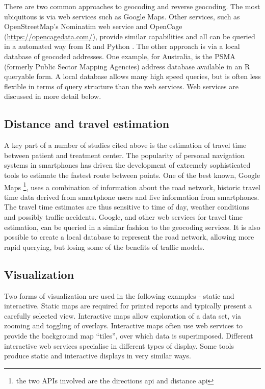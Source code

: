 \documentclass[utf8]{frontiersHLTH}
\begin{document}
There are two common approaches to geocoding and reverse geocoding. The
most ubiquitous is via web services such as Google Maps. Other services,
such as OpenStreetMap's Nominatim web service and OpenCage
(\url{https://opencagedata.com/}), provide similar capabilities and all
can be queried in a automated way from R and Python \cite{opencage}. The
other approach is via a local database of geocoded addresses. One
example, for Australia, is the PSMA (formerly Public Sector Mapping
Agencies) address database available in an R queryable form. A local
database allows many high speed queries, but is often less flexible in
terms of query structure than the web services. Web services are
discussed in more detail below.

\subsection{Distance and travel
estimation}\label{distance-and-travel-estimation}

A key part of a number of studies cited above is the estimation of
travel time between patient and treatment center. The popularity of
personal navigation systems in smartphones has driven the development of
extremely sophisticated tools to estimate the fastest route between
points. One of the best known, Google Maps \footnote{the two APIs
involved are the directions api and distance api}, uses a combination
of information about the road network, historic travel time data derived
from smartphone users and live information from smartphones. The travel
time estimates are thus sensitive to time of day, weather conditions and
possibly traffic accidents. Google, and other web services for travel
time estimation, can be queried in a similar fashion to the geocoding
services. It is also possible to create a local database to represent
the road network, allowing more rapid querying, but losing some of the
benefits of traffic models.

\subsection{Visualization}\label{visualization}

Two forms of visualization are used in the following examples - static
and interactive. Static maps are required for printed reports and
typically present a carefully selected view. Interactive maps allow
exploration of a data set, via zooming and toggling of overlays.
Interactive maps often use web services to provide the background map
``tiles'', over which data is superimposed. Different interactive web
services specialise in different types of display. Some tools produce
static and interactive displays in very similar ways.
\end{document}
